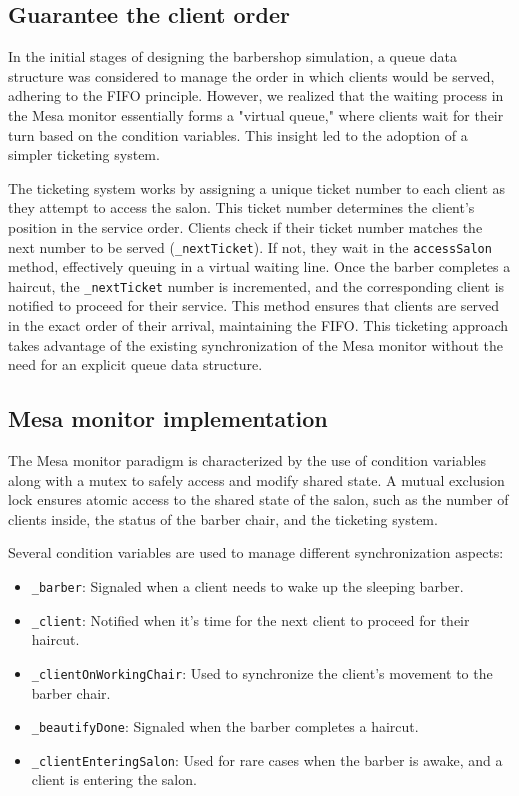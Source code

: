 \documentclass{article}
\begin{document}
    \subsection{Guarantee the client order}

    In the initial stages of designing the barbershop simulation, a queue data structure was considered to manage the order in which clients would be served, adhering to the FIFO principle. However, we realized that the waiting process in the Mesa monitor essentially forms a "virtual queue," where clients wait for their turn based on the condition variables. This insight led to the adoption of a simpler ticketing system.

    The ticketing system works by assigning a unique ticket number to each client as they attempt to access the salon. This ticket number determines the client's position in the service order. Clients check if their ticket number matches the next number to be served (\texttt{\_nextTicket}). If not, they wait in the \texttt{accessSalon} method, effectively queuing in a virtual waiting line. Once the barber completes a haircut, the \texttt{\_nextTicket} number is incremented, and the corresponding client is notified to proceed for their service. This method ensures that clients are served in the exact order of their arrival, maintaining the FIFO. This ticketing approach takes advantage of the existing synchronization of the Mesa monitor without the need for an explicit queue data structure.

    \pagebreak

    \subsection{Mesa monitor implementation}

    The Mesa monitor paradigm is characterized by the use of condition variables along with a mutex to safely access and modify shared state. A mutual exclusion lock ensures atomic access to the shared state of the salon, such as the number of clients inside, the status of the barber chair, and the ticketing system.

    Several condition variables are used to manage different synchronization aspects:
    \begin{itemize}
        \item \texttt{\_barber}: Signaled when a client needs to wake up the sleeping barber.
        \item \texttt{\_client}: Notified when it's time for the next client to proceed for their haircut.
        \item \texttt{\_clientOnWorkingChair}: Used to synchronize the client's movement to the barber chair.
        \item \texttt{\_beautifyDone}: Signaled when the barber completes a haircut.
        \item \texttt{\_clientEnteringSalon}: Used for rare cases when the barber is awake, and a client is entering the salon.
    \end{itemize}
\end{document}
